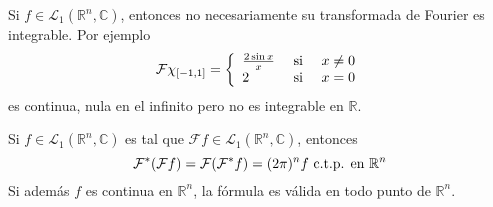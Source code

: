 \documentclass[12pt]{report}
\newcounter{it}
\theoremstyle{largebreak}
\newcommand{\fou}[1]{\ensuremath{\mathcal{F}#1}}
\begin{document}
    \begin{obs}
        Si $f\in\mathcal{L}_1(\mathbb{R}^n,\mathbb{C})$, entonces no necesariamente su transformada de Fourier es integrable. Por ejemplo
        \begin{equation*}
             \fou{\chi_{[-1,1]}}=\left\{
                \begin{array}{lcr}
                    \frac{2\sin x}{x} & \textup{ si } & x\neq0\\
                    2 & \textup{ si } & x=0\\
                \end{array}
             \right.
        \end{equation*}
        es continua, nula en el infinito pero no es integrable en $\mathbb{R}$.
    \end{obs}

    \renewcommand{\theenumi}{\arabic{enumi}}

    \begin{theor}
        Si $f\in\mathcal{L}_1(\mathbb{R}^n,\mathbb{C})$ es tal que $\fou{f}\in\mathcal{L}_1(\mathbb{R}^n,\mathbb{C})$, entonces
        \begin{equation*}
            \fou^*{(\fou{f})}=\fou{(\fou^*{f})}=(2\pi)^n f\textup{ c.t.p. en }\mathbb{R}^n
        \end{equation*}
        Si además $f$ es continua en $\mathbb{R}^n$, la fórmula es válida en todo punto de $\mathbb{R}^n$.
    \end{theor}
\end{document}
